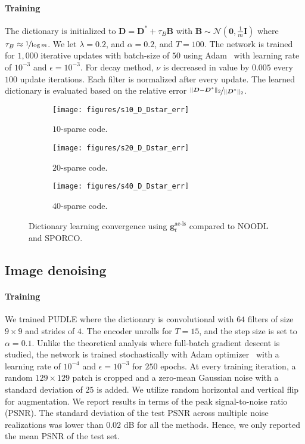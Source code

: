 \documentclass[10pt]{article} %
\newcommand{\D}{{\bm D}}
\newcommand{\eye}{{\bm I}}
\newcommand{\g}{{\bm g}}
\newcommand{\zero}{{\bm 0}}
\begin{document}
\paragraph{Training} The dictionary is initialized to $\D = \D^{\ast} + \tau_B {\bm B}$ with ${\bm B} \sim \mathcal{N}(\zero, \frac{1}{m} \eye)$ where $\tau_B \approx \nicefrac{1}{\log m}$. We let $\lambda = 0.2$, and $\alpha = 0.2$, and $T=100$. The network is trained for $1{,}000$ iterative updates with batch-size of $50$ using Adam~\citep{kingma2014adam} with learning rate of $10^{-3}$ and $\epsilon = 10^{-3}$.  For decay method, $\nu$ is decreased in value by $0.005$ every $100$ update iterations. Each filter is normalized after every update. The learned dictionary is evaluated based on the relative error $\nicefrac{\| \D - \D^{\ast} \|_2}{\| \D^{\ast} \|_2}$.
%
\begin{figure}[t]
	\centering
	\begin{subfigure}[t]{0.325\linewidth}
	\centering
	\texttt{[image: figures/s10\_D\_Dstar\_err]}
	  \caption{$10$-sparse code.}
  	\label{fig:s10}
	\end{subfigure}
	\begin{subfigure}[t]{0.325\linewidth}
	\centering
	\texttt{[image: figures/s20\_D\_Dstar\_err]}
 	 \caption{$20$-sparse code.}
  	\label{fig:s20}
	\end{subfigure}
	\begin{subfigure}[t]{0.325\linewidth}
	\centering
	\texttt{[image: figures/s40\_D\_Dstar\_err]}
	  \caption{$40$-sparse code.}
  	\label{fig:s40}
	\end{subfigure}
	\caption{Dictionary learning convergence using $\g_t^{\text{ae-ls}}$ compared to NOODL and SPORCO.}
	\label{fig:baslines_full}
	\vspace{-4mm}
\end{figure}
%
\subsection{Image denoising}
%
\paragraph{Training} We trained PUDLE where the dictionary is convolutional with $64$ filters of size $9 \times 9$ and strides of $4$. The encoder unrolls for $T=15$, and the step size is set to $\alpha = 0.1$. Unlike the theoretical analysis where full-batch gradient descent is studied, the network is trained stochastically with Adam optimizer~\citep{kingma2014adam} with a learning rate of $10^{-4}$ and $\epsilon = 10^{-3}$ for $250$ epochs. At every training iteration, a random $129 \times 129$ patch is cropped and a zero-mean Gaussian noise with a standard deviation of $25$ is added. We utilize random horizontal and vertical flip for augmentation. We report results in terms of the peak signal-to-noise ratio (PSNR). The standard deviation of the test PSNR across multiple noise realizations was lower than $0.02$ dB for all the methods. Hence, we only reported the mean PSNR of the test set.
%
\end{document}
